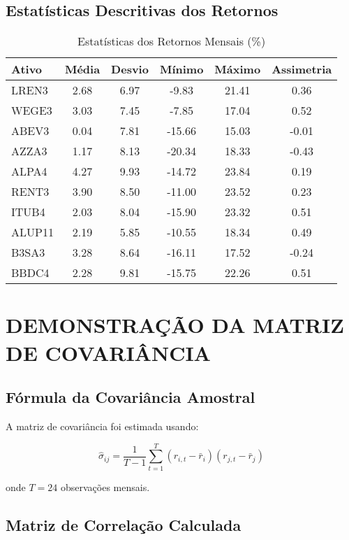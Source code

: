 \subsection{Estatísticas Descritivas dos Retornos}

\begin{table}[H]
\centering
\caption{Estatísticas dos Retornos Mensais (\%)}
\begin{tabular}{|l|c|c|c|c|c|}
\hline
\textbf{Ativo} & \textbf{Média} & \textbf{Desvio} & \textbf{Mínimo} & \textbf{Máximo} & \textbf{Assimetria} \\
\hline
LREN3 & 2.68 & 6.97 & -9.83 & 21.41 & 0.36 \\
WEGE3 & 3.03 & 7.45 & -7.85 & 17.04 & 0.52 \\
ABEV3 & 0.04 & 7.81 & -15.66 & 15.03 & -0.01 \\
AZZA3 & 1.17 & 8.13 & -20.34 & 18.33 & -0.43 \\
ALPA4 & 4.27 & 9.93 & -14.72 & 23.84 & 0.19 \\
RENT3 & 3.90 & 8.50 & -11.00 & 23.52 & 0.23 \\
ITUB4 & 2.03 & 8.04 & -15.90 & 23.32 & 0.51 \\
ALUP11 & 2.19 & 5.85 & -10.55 & 18.34 & 0.49 \\
B3SA3 & 3.28 & 8.64 & -16.11 & 17.52 & -0.24 \\
BBDC4 & 2.28 & 9.81 & -15.75 & 22.26 & 0.51 \\
\hline
\end{tabular}
\end{table}

\section{DEMONSTRAÇÃO DA MATRIZ DE COVARIÂNCIA}

\subsection{Fórmula da Covariância Amostral}

A matriz de covariância foi estimada usando:

\begin{equation}
\hat{\sigma}_{ij} = \frac{1}{T-1} \sum_{t=1}^{T} (r_{i,t} - \bar{r}_i)(r_{j,t} - \bar{r}_j)
\end{equation}

onde $T = 24$ observações mensais.

\subsection{Matriz de Correlação Calculada}


